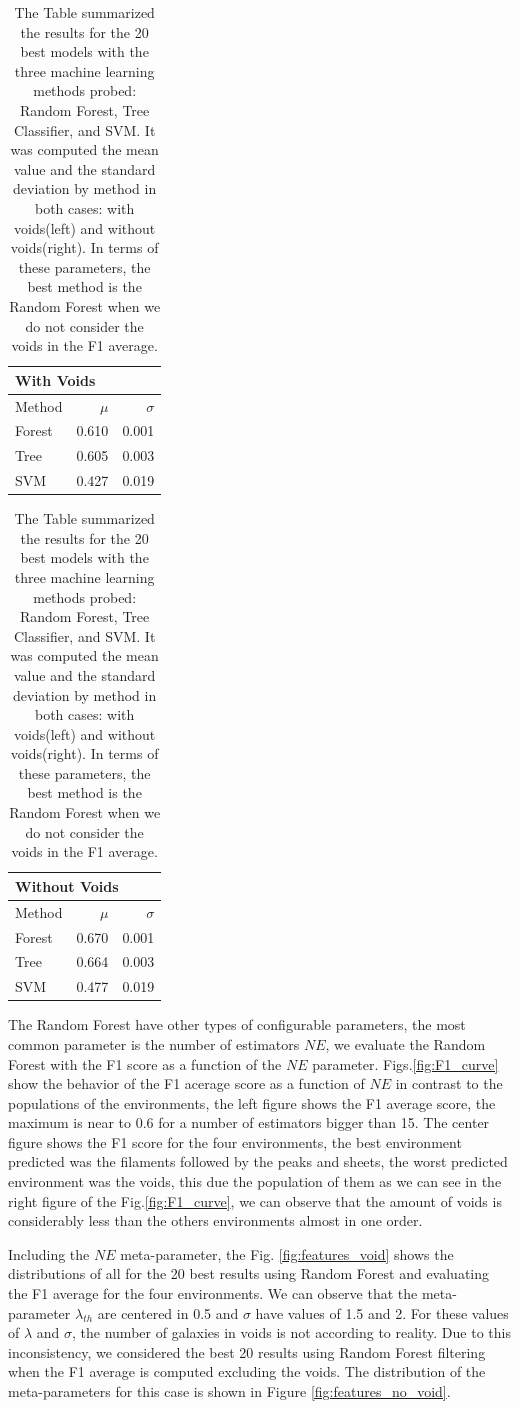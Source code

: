 \documentclass[usenatbib]{mnras}
\begin{document}
\begin{table}
\centering
\begin{tabular}{lrr}
\hline
\multicolumn{3}{l}{With Voids}\\
\hline
 Method   &   $\mu$ &   $\sigma$ \\
\hline
 Forest   &   0.610 &      0.001 \\
 Tree     &   0.605 &      0.003 \\
 SVM      &   0.427 &      0.019 \\
\hline
\end{tabular}
\begin{tabular}{lrr}
\hline
\multicolumn{3}{l}{Without Voids}\\
\hline
 Method   &   $\mu$ &   $\sigma$ \\
\hline
 Forest   &   0.670 &      0.001 \\
 Tree     &   0.664 &      0.003 \\
 SVM      &   0.477 &      0.019 \\
\hline
\end{tabular}
\caption{The Table summarized the results for the 20 best models with the three machine learning methods probed: Random Forest, Tree Classifier, and SVM. It was computed the mean value and the standard deviation by method in both cases: with voids(left) and without voids(right). In terms of these parameters, the best method is the Random Forest when we do not consider the voids in the F1 average.}
\label{tab:methods}
\end{table}

The Random Forest have other types of configurable parameters, the most common parameter is the number of estimators $NE$, we evaluate the Random Forest with the F1 score as a function of the $NE$ parameter. 
Figs.\ref{fig:F1_curve} show the behavior of the F1 acerage score as a function of $NE$ in contrast to the populations of the environments,
the left figure shows the F1 average score,
the maximum is near to 0.6 for a number of estimators bigger than 15.
The center figure shows the F1 score for the four environments,
the best environment predicted was the filaments followed by the peaks and sheets,
the worst predicted environment was the voids,
this due the population of them as we can see in the right figure of the Fig.\ref{fig:F1_curve},
we can observe that the amount of voids is considerably less than the others environments almost in one order.

Including the $NE$ meta-parameter, the Fig. \ref{fig:features_void} shows the distributions of all for the 20 best results using Random Forest and evaluating the F1 average for the four environments. We can observe that the meta-parameter $\lambda_{th}$ are centered in 0.5 and $\sigma$ have values of 1.5 and 2. For these values of $\lambda$ and $\sigma$, the number of galaxies in voids is not according to reality. Due to this inconsistency, we considered the best 20 results using Random Forest filtering when the F1 average is computed excluding the voids. The distribution of the meta-parameters for this case is shown in Figure \ref{fig:features_no_void}.
\end{document}
